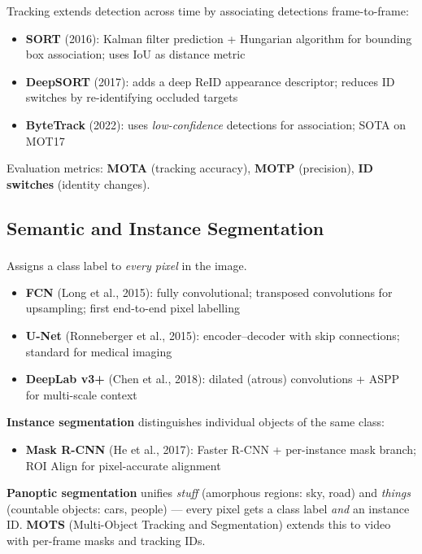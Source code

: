 \begin{tcbitemize}[ skin=sectionraster ]
    \tcbitem[title={Multi-Object Tracking}, raster multicolumn=6]
    Tracking extends detection across time by associating detections frame-to-frame:
    \begin{itemize}
        \item \textbf{SORT} (2016): Kalman filter prediction + Hungarian algorithm for bounding box association; uses IoU as distance metric
        \item \textbf{DeepSORT} (2017): adds a deep ReID appearance descriptor; reduces ID switches by re-identifying occluded targets
        \item \textbf{ByteTrack} (2022): uses \emph{low-confidence} detections for association; SOTA on MOT17
    \end{itemize}
    Evaluation metrics: \textbf{MOTA} (tracking accuracy), \textbf{MOTP} (precision), \textbf{ID switches} (identity changes).
\end{tcbitemize}

\subsection{Semantic and Instance Segmentation}

\begin{tcbitemize}[ skin=sectionraster ]
    \tcbitem[title={Semantic Segmentation}, raster multicolumn=3]
    Assigns a class label to \emph{every pixel} in the image\textsuperscript{\cite[][pp.~110--112]{fleuretLittleBookDeep}}.
    \begin{itemize}
        \item \textbf{FCN} (Long et al., 2015): fully convolutional; transposed convolutions for upsampling; first end-to-end pixel labelling
        \item \textbf{U-Net} (Ronneberger et al., 2015): encoder--decoder with skip connections; standard for medical imaging
        \item \textbf{DeepLab v3+} (Chen et al., 2018): dilated (atrous) convolutions + ASPP for multi-scale context
    \end{itemize}

    \tcbitem[title={Instance and Panoptic Segmentation}, raster multicolumn=3]
    \textbf{Instance segmentation} distinguishes individual objects of the same class:
    \begin{itemize}
        \item \textbf{Mask R-CNN} (He et al., 2017): Faster R-CNN + per-instance mask branch; ROI Align for pixel-accurate alignment
    \end{itemize}
    \textbf{Panoptic segmentation} unifies \emph{stuff} (amorphous regions: sky, road) and \emph{things} (countable objects: cars, people) --- every pixel gets a class label \emph{and} an instance ID.
    \textbf{MOTS} (Multi-Object Tracking and Segmentation) extends this to video with per-frame masks and tracking IDs.
\end{tcbitemize}


